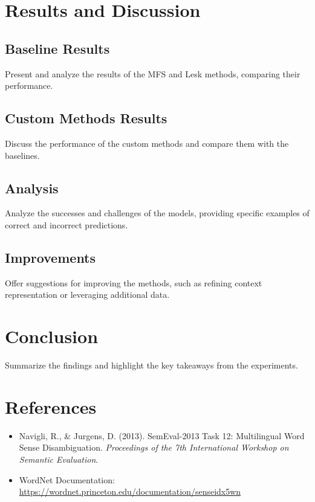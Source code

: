 \documentclass[11pt]{article}
\begin{document}
\section{Results and Discussion}
\subsection{Baseline Results}
Present and analyze the results of the MFS and Lesk methods, comparing their performance.

\subsection{Custom Methods Results}
Discuss the performance of the custom methods and compare them with the baselines.

\subsection{Analysis}
Analyze the successes and challenges of the models, providing specific examples of correct and incorrect predictions.

\subsection{Improvements}
Offer suggestions for improving the methods, such as refining context representation or leveraging additional data.

\section{Conclusion}
Summarize the findings and highlight the key takeaways from the experiments.

\section*{References}
\begin{itemize}
    \item Navigli, R., \& Jurgens, D. (2013). SemEval-2013 Task 12: Multilingual Word Sense Disambiguation. \emph{Proceedings of the 7th International Workshop on Semantic Evaluation}.
    \item WordNet Documentation: \url{https://wordnet.princeton.edu/documentation/senseidx5wn}
\end{itemize}
\end{document}

